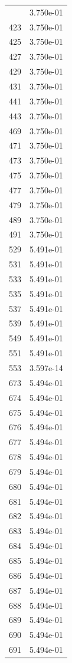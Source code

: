 \documentclass[12pt]{article}
\begin{document}
\begin{longtable}{@{}cc@{}}
\bottomrule
\endlastfoot
421 & 3.750e-01 \\
423 & 3.750e-01 \\
425 & 3.750e-01 \\
427 & 3.750e-01 \\
429 & 3.750e-01 \\
431 & 3.750e-01 \\
441 & 3.750e-01 \\
443 & 3.750e-01 \\
469 & 3.750e-01 \\
471 & 3.750e-01 \\
473 & 3.750e-01 \\
475 & 3.750e-01 \\
477 & 3.750e-01 \\
479 & 3.750e-01 \\
489 & 3.750e-01 \\
491 & 3.750e-01 \\
529 & 5.491e-01 \\
531 & 5.491e-01 \\
533 & 5.491e-01 \\
535 & 5.491e-01 \\
537 & 5.491e-01 \\
539 & 5.491e-01 \\
549 & 5.491e-01 \\
551 & 5.491e-01 \\
553 & 3.597e-14 \\
673 & 5.494e-01 \\
674 & 5.494e-01 \\
675 & 5.494e-01 \\
676 & 5.494e-01 \\
677 & 5.494e-01 \\
678 & 5.494e-01 \\
679 & 5.494e-01 \\
680 & 5.494e-01 \\
681 & 5.494e-01 \\
682 & 5.494e-01 \\
683 & 5.494e-01 \\
684 & 5.494e-01 \\
685 & 5.494e-01 \\
686 & 5.494e-01 \\
687 & 5.494e-01 \\
688 & 5.494e-01 \\
689 & 5.494e-01 \\
690 & 5.494e-01 \\
691 & 5.494e-01 \\

\end{longtable}
\end{document}

